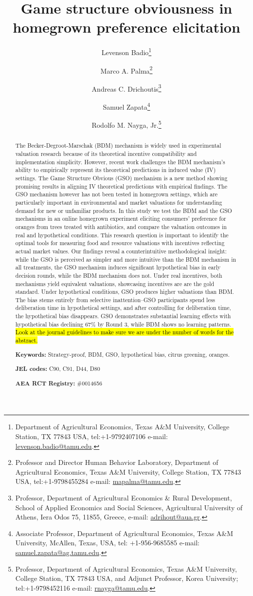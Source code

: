 \documentclass[12pt]{article}
\title{\textbf{Game structure obviousness in homegrown preference elicitation}}
\author[1]{Levenson Badio\thanks{Department of Agricultural Economics, Texas A\&M University, College Station, TX  77843 USA, tel:+1-9792407106 e-mail: \href{mailto:levenson.badio@tamu.edu}{levenson.badio@tamu.edu}.}}
\author[1]{Marco A. Palma\thanks{Professor and Director Human Behavior Laboratory, Department of Agricultural Economics, Texas A\&M University, College Station, TX  77843 USA, tel:+1-9798455284 e-mail: \href{mailto:mapalma@tamu.edu}{mapalma@tamu.edu}.}}
\author[2]{Andreas C. Drichoutis\thanks{Professor, Department of Agricultural Economics \& Rural Development, School of Applied Economics and Social Sciences, Agricultural University of Athens, Iera Odos 75, 11855, Greece, e-mail: \href{mailto:adrihout@aua.gr}{adrihout@aua.gr}.}}
\author[1]{Samuel Zapata\thanks{Associate Professor, Department of Agricultural Economics, Texas A\&M University, McAllen, Texas, USA, tel: +1-956-9685585 e-mail: \href{samuel.zapata@ag.tamu.edu}{samuel.zapata@ag.tamu.edu}.}}
\author[1]{Rodolfo M. Nayga, Jr.\thanks{Professor, Department of Agricultural Economics, Texas A\&M University, College Station, TX  77843 USA, and Adjunct Professor, Korea University; tel:+1-9798452116 e-mail: \href{mailto:rnayga@tamu.edu}{rnayga@tamu.edu}.}}
\affil[1]{Texas A\&M University}
\affil[2]{Agricultural University of Athens}
\date{}
\begin{document}
\maketitle
 \onehalfspacing

\begin{abstract}
\noindent The Becker-Degroot-Marschak (BDM) mechanism is widely used in experimental valuation research because of its theoretical incentive compatibility and implementation simplicity. However, recent work challenges the BDM mechanism's ability to empirically represent its theoretical predictions in induced value (IV) settings. The Game Structure Obvious (GSO) mechanism is a new method showing promising results in aligning IV theoretical predictions with empirical findings. The GSO mechanism however has not been tested in homegrown settings, which are particularly important in environmental and market valuations for understanding demand for new or unfamiliar products. In this study we test the BDM and the GSO mechanisms in an online homegrown experiment eliciting consumers' preference for oranges from trees treated with antibiotics, and compare the valuation outcomes in real and hypothetical conditions. This research question is important to identify the optimal tools for measuring food and resource valuations with incentives reflecting actual market values. Our findings reveal a counterintuitive methodological insight: while the GSO is perceived as simpler and more intuitive than the BDM mechanism in all treatments, the GSO mechanism induces significant hypothetical bias in early decision rounds, while the BDM mechanism does not. Under real incentives, both mechanisms yield equivalent valuations, showcasing incentives are are the gold standard. Under hypothetical conditions, GSO produces  higher valuations than BDM. The bias stems entirely from selective inattention--GSO participants spend less deliberation time in hypothetical settings, and after controlling for deliberation time, the hypothetical bias disappears. GSO demonstrates substantial learning effects with hypothetical bias declining 67\% by Round 3, while BDM shows no learning patterns. \hl{Look at the journal guidelines to make sure we are under the number of words for the abstract.}

\textbf{Keywords:} Strategy-proof, BDM, GSO, hypothetical bias, citrus greening, oranges. 
	
\textbf{JEL codes:} C90, C91, D44, D80
 
 \textbf{AEA RCT Registry:} \#0014656
 
 \end{abstract}
\end{document}

